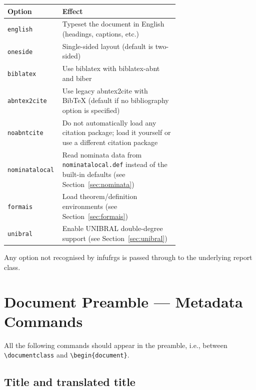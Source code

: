 \documentclass[11pt,a4paper]{article}
\newcommand{\pkg}[1]{\textsf{#1}}
\newcommand{\cls}[1]{\textsf{#1}}
\newcommand{\opt}[1]{\texttt{#1}}
\newcommand{\cmd}[1]{\texttt{\textbackslash #1}}
\newcommand{\file}[1]{\texttt{#1}}
\begin{document}
\begin{center}
\begin{tabular}{@{}lp{0.68\linewidth}@{}}
  \toprule
  Option              & Effect \\
  \midrule
  \opt{english}       & Typeset the document in English (headings, captions, etc.) \\
  \opt{oneside}       & Single-sided layout (default is two-sided) \\
  \opt{biblatex}      & Use \pkg{biblatex} with \pkg{biblatex-abnt} and \textsf{biber} \\
  \opt{abntex2cite}   & Use legacy \pkg{abntex2cite} with \textsf{BibTeX} (default if no bibliography option is specified) \\
  \opt{noabntcite}    & Do not automatically load any citation package;
                        load it yourself or use a different citation package \\
  \opt{nominatalocal} & Read nominata data from \file{nominatalocal.def}
                        instead of the built-in defaults
                        (see Section~\ref{sec:nominata}) \\
  \opt{formais}       & Load theorem/definition environments
                        (see Section~\ref{sec:formais}) \\
  \opt{unibral}       & Enable UNIBRAL double-degree support
                        (see Section~\ref{sec:unibral}) \\
  \bottomrule
\end{tabular}
\end{center}

Any option not recognised by \cls{infufrgs} is passed through to the
underlying \cls{report} class.

\section{Document Preamble — Metadata Commands}
\label{sec:preamble}

All the following commands should appear in the preamble, i.e., between
\cmd{documentclass} and \cmd{begin\{document\}}.

\subsection{Title and translated title}
\end{document}
